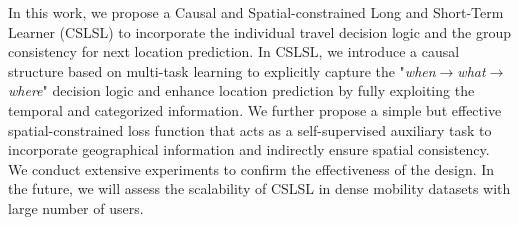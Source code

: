 \documentclass[sigconf]{acmart}
\begin{document}
    In this work, we propose a Causal and Spatial-constrained Long and Short-Term Learner (CSLSL) to incorporate the individual travel decision logic and the group consistency for next location prediction. In CSLSL, we introduce a causal structure based on multi-task learning to explicitly capture the "\textit{when$\rightarrow$what$\rightarrow$where}" decision logic and enhance location prediction by fully exploiting the temporal and categorized information. We further propose a simple but effective spatial-constrained loss function that acts as a self-supervised auxiliary task to incorporate geographical information and indirectly ensure spatial consistency. We conduct extensive experiments to confirm the effectiveness of the design. 
    In the future, we will assess the scalability of CSLSL in dense mobility datasets with large number of users.
    


\end{document}
